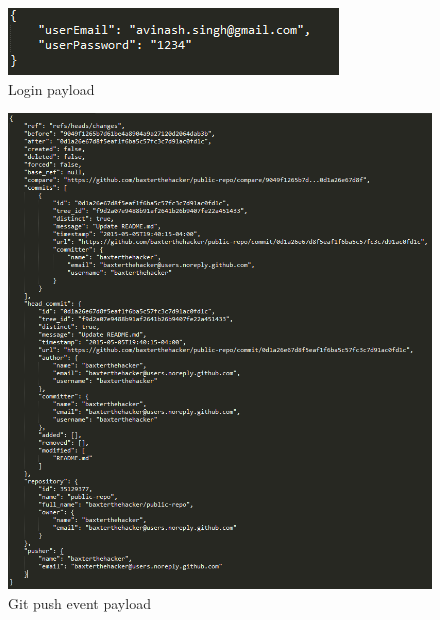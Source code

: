 \documentclass[11pt,a4paper]{article}
\begin{document}
\begin{figure}[H]
	\centering
	\includegraphics[scale=1.0]{../Images/loginEvent}
	\caption{Login payload}
\end{figure}

\begin{figure}[H]
	\centering
	\includegraphics[width=\linewidth]{../Images/gitpush}
	\caption{Git push event payload}
\end{figure}
\end{document}
